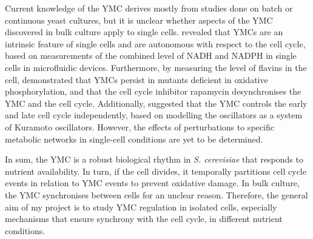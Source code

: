 Current knowledge of the YMC derives mostly from studies done on batch or continuous yeast cultures, but it is unclear whether aspects of the YMC discovered in bulk culture apply to single cells.
\citet{papagiannakisAutonomousMetabolicOscillations2017} revealed that YMCs are an intrinsic feature of single cells and are autonomous with respect to the cell cycle, based on measurements of the combined level of NADH and NADPH in single cells in microfluidic devices.
Furthermore, by measuring the level of flavins in the cell, \citet{baumgartnerFlavinbasedMetabolicCycles2018} demonstrated that YMCs persist in mutants deficient in oxidative phosphorylation, and that the cell cycle inhibitor rapamycin desynchronises the YMC and the cell cycle.
Additionally, \citet{ozsezenInferenceHighLevelInteraction2019} suggested that the YMC controls the early and late cell cycle independently, based on modelling the oscillators as a system of Kuramoto oscillators.
However, the effects of perturbations to specific metabolic networks in single-cell conditions are yet to be determined.



In sum, the YMC is a robust biological rhythm in \emph{S. cerevisiae} that responds to nutrient availability.
In turn, if the cell divides, it temporally partitions cell cycle events in relation to YMC events to prevent oxidative damage.
In bulk culture, the YMC synchronises between cells for an unclear reason.
Therefore, the general aim of my project is to study YMC regulation in isolated cells, especially mechanisms that ensure synchrony with the cell cycle, in different nutrient conditions.

